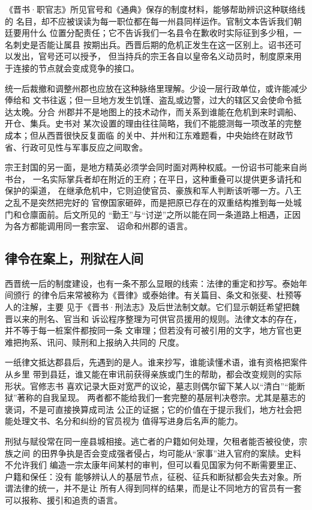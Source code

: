 《晋书·职官志》所见官号和《通典》保存的制度材料，能够帮助辨识这种联络线的
名目，却不应被误读为每一职位都在每一州县同样运作。官制文本告诉我们朝廷要用什么
位置分配责任；它不告诉我们一名县令在歉收时实际征到多少租，一名刺史是否能让属县
按期出兵。西晋后期的危机正发生在这一区别上。诏书还可以发出，官号还可以授予，
但当持兵的宗王各自以皇帝名义动员时，制度原来用于连接的节点就会变成竞争的接口。

统一后裁撤和调整州郡也应放在这种脉络里理解。少设一层行政单位，或许能减少俸给和
文书往返；但一旦地方发生饥馑、盗乱或边警，过大的辖区又会使命令抵达太晚。分合
州郡并不是地图上的技术动作，而关系到谁能在危机到来时调船、开仓、集兵。史书对
某次设置的理由往往简略，我们不能臆测每一项改革的完整成本；但从西晋很快反复面临
的关中、并州和江东难题看，中央始终在财政节省、行政可见性与军事反应之间取舍。

宗王封国的另一面，是地方精英必须学会同时面对两种权威。一份诏书可能来自尚书台，
一名实际掌兵者却在附近的王府；在平日，这种重叠可以提供更多请托和保护的渠道，
在继承危机中，它则迫使官员、豪族和军人判断该听哪一方。八王之乱不是突然把完好的
官僚国家砸碎，而是把原已存在的双重结构推到每一处城门和仓廪面前。后文所见的
“勤王”与“讨逆”之所以能在同一条道路上相遇，正因为各方都能调用同一套宗室、
诏命和州郡的语言。

\subsection{律令在案上，刑狱在人间}

西晋统一后的制度建设，也有一条不那么显眼的线索：法律的重定和抄写。泰始年间颁行
的律令后来常被称为《晋律》或泰始律。有关篇目、条文和张斐、杜预等人的注解，主要
见于《晋书·刑法志》及后世法制文献。它们显示朝廷希望把魏晋以来的刑名、官当和
诉讼程序整理为可供官员援用的规则。法律文本的存在，并不等于每一桩案件都按同一条
文审理；但若没有可被引用的文字，地方官也更难把拘系、讯问、赎刑和上报纳入共同的
尺度。

一纸律文抵达郡县后，先遇到的是人。谁来抄写，谁能读懂术语，谁有资格把案件从乡里
带到县廷，谁又能在审讯前获得亲族或门生的帮助，都会改变规则的实际形状。官修志书
喜欢记录大臣对宽严的议论，墓志则偶尔留下某人以“清白”“能断狱”著称的自我呈现。
两者都不能给我们一套完整的基层判决卷宗。尤其是墓志的褒词，不是可直接换算成司法
公正的证据；它的价值在于提示我们，地方社会把能处理文书、名分和纠纷的官员视为
值得写进身后名声的能力。

刑狱与赋役常在同一座县城相接。逃亡者的户籍如何处理，欠租者能否被役使，宗族之间
的田界争执是否会变成强者侵占，均可能从“家事”进入官府的案牍。史料不允许我们
编造一宗太康年间某村的审判，但可以看见国家为何不断需要里正、户籍和保任：没有
能够辨认人的基层节点，征税、征兵和断狱都会失去对象。所谓法律的统一，并不是让
所有人得到同样的结果，而是让不同地方的官员有一套可以报称、援引和追责的语言。

